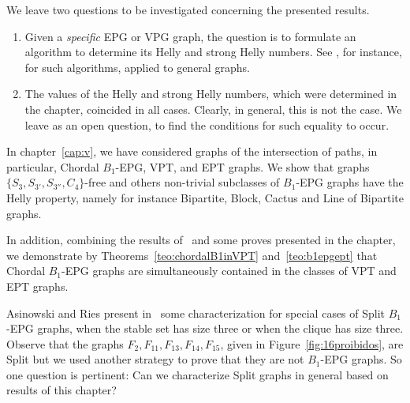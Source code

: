 \normalsize

We leave two questions to be investigated concerning the presented results.

\begin{enumerate}
\item Given a {\it specific}  EPG or VPG graph, the question is to formulate an algorithm to determine its Helly and strong Helly numbers. See \cite{dourado2008improved}, for instance, for such algorithms, applied to general graphs. 

\item The values of the Helly and strong Helly numbers, which were determined in the chapter, coincided in all cases. Clearly, in general, this is not the case. We leave as an open question, to find the conditions for such equality to occur. \end{enumerate}


In chapter~\ref{cap:v},  we have considered graphs of the intersection of paths, in particular, Chordal $B_1$-EPG, VPT, and EPT graphs. We show that graphs $\{S_3, S_{3'},S_{3''},C_4\}$-free and others non-trivial subclasses of  $B_1$-EPG graphs have the Helly property, namely for instance Bipartite, Block, Cactus and Line of Bipartite graphs. 
  
  In addition, combining the results of~\cite{alcon2014recognizing,Asinowski2009, golumbic2009} and some proves  presented in the chapter, we demonstrate by  Theorems~\ref{teo:chordalB1inVPT} and~\ref{teo:b1epgept} that Chordal $B_1$-EPG graphs are simultaneously contained in the classes of VPT and EPT graphs.  
 
 

Asinowski and Ries present in~\cite{ries2009} some characterization for special cases of Split $B_1$-EPG graphs, when the stable set has size three or when the clique has size three. Observe that the graphs $F_2, F_{11}, F_{13}, F_{14}, F_{15}$, given in Figure~\ref{fig:16proibidos}, are Split but we used another strategy to prove that they are not $B_1$-EPG graphs. So one question is pertinent: Can we characterize Split graphs in general based on results of this chapter? 

